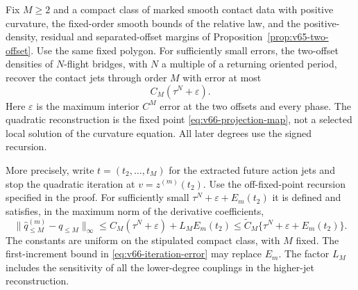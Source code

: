 \begin{proposition}
\label{prop:v66-finite-flight}
Fix $M\ge2$ and a compact class of marked smooth contact data with
positive curvature, the fixed-order smooth bounds of the relative law,
and the positive-density, residual and separated-offset margins of
Proposition~\ref{prop:v65-two-offset}.  Use the same fixed polygon.
For sufficiently small errors, the two-offset densities of $N$-flight
bridges, with $N$ a multiple of a returning oriented period, recover the
contact jets through order $M$ with error at most
\begin{equation}\label{eq:v66-fixed-order-error}
 C_M(\tau^N+\varepsilon).
\end{equation}
Here $\varepsilon$ is the maximum interior $C^M$ error at the two
offsets and every phase.  The quadratic reconstruction is the fixed
point \eqref{eq:v66-projection-map}, not a selected local solution of
the curvature equation.  All later degrees use the signed recursion.

More precisely, write $t=(t_2,\ldots,t_M)$ for the extracted future
action jets and stop the quadratic iteration at $v=z^{(m)}(t_2)$.
Use the off-fixed-point recursion specified in the proof.  For
sufficiently small $\tau^N+\varepsilon+E_m(t_2)$ it is defined and
satisfies, in the maximum norm of the derivative coefficients,
\begin{equation}\label{eq:v67-complete-stopping-error}
 \|\widehat q_{\le M}^{(m)}-q_{\le M}\|_\infty
 \le C_M(\tau^N+\varepsilon)+L_M E_m(t_2)
 \le\widetilde C_M\{\tau^N+\varepsilon+E_m(t_2)\}.
\end{equation}
The constants are uniform on the stipulated compact class, with $M$
fixed.  The first-increment bound in \eqref{eq:v66-iteration-error}
may replace $E_m$.  The factor $L_M$ includes the sensitivity of
all the lower-degree couplings in the higher-jet reconstruction.
\end{proposition}
